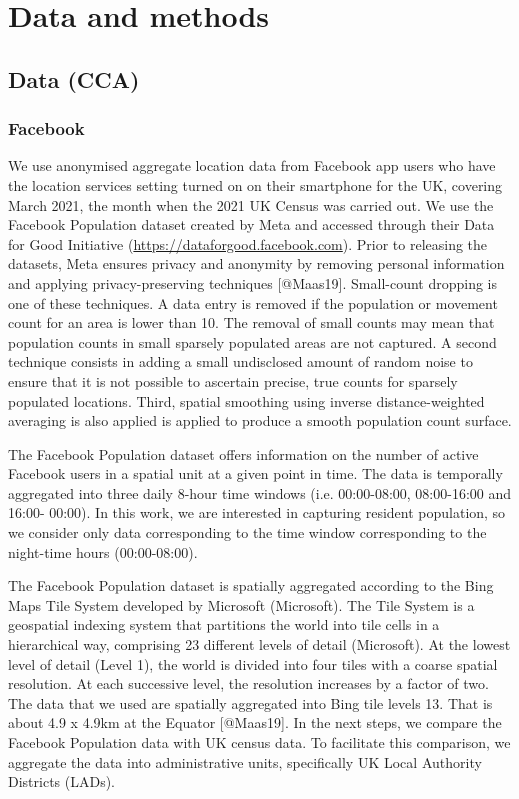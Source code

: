 \documentclass[]{rsos}%
\begin{document}
\section{Data and methods}\label{data-and-methods}

\subsection{Data (CCA)}\label{data-cca}

\subsubsection{Facebook}\label{facebook}

We use anonymised aggregate location data from Facebook app users who
have the location services setting turned on on their smartphone for the
UK, covering March 2021, the month when the 2021 UK Census was carried
out. We use the Facebook Population dataset created by Meta and accessed
through their Data for Good Initiative
(\url{https://dataforgood.facebook.com}). Prior to releasing the datasets,
Meta ensures privacy and anonymity by removing personal information and
applying privacy-preserving techniques {[}@Maas19{]}. Small-count dropping
is one of these techniques. A data entry is removed if the population or
movement count for an area is lower than 10. The removal of small counts
may mean that population counts in small sparsely populated areas are
not captured. A second technique consists in adding a small undisclosed
amount of random noise to ensure that it is not possible to ascertain
precise, true counts for sparsely populated locations. Third, spatial
smoothing using inverse distance-weighted averaging is also applied is
applied to produce a smooth population count surface.

The Facebook Population dataset offers information on the number of
active Facebook users in a spatial unit at a given point in time. The
data is temporally aggregated into three daily 8-hour time windows (i.e.
00:00-08:00, 08:00-16:00 and 16:00- 00:00). In this work, we are
interested in capturing resident population, so we consider only data
corresponding to the time window corresponding to the night-time hours
(00:00-08:00).

The Facebook Population dataset is spatially aggregated according to the
Bing Maps Tile System developed by Microsoft (Microsoft). The Tile
System is a geospatial indexing system that partitions the world into
tile cells in a hierarchical way, comprising 23 different levels of
detail (Microsoft). At the lowest level of detail (Level 1), the world
is divided into four tiles with a coarse spatial resolution. At each
successive level, the resolution increases by a factor of two. The data
that we used are spatially aggregated into Bing tile levels 13. That is
about 4.9 x 4.9km at the Equator {[}@Maas19{]}. In the next steps, we
compare the Facebook Population data with UK census data. To facilitate
this comparison, we aggregate the data into administrative units,
specifically UK Local Authority Districts (LADs).
\end{document}

